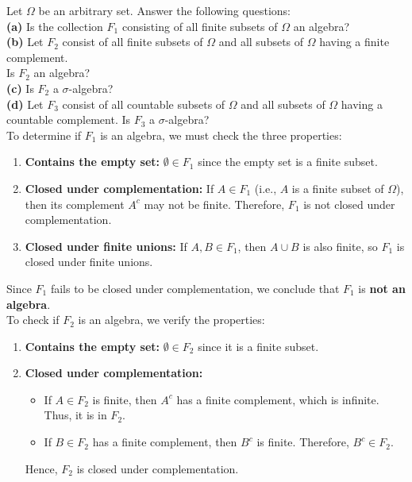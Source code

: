 \begin{example}
    Let \(\Omega\) be an arbitrary set. Answer the following questions:\\
    \textbf{(a)} Is the collection \(F_1\) consisting of all finite subsets of \(\Omega\) an algebra?\\
    \textbf{(b)} Let \(F_2\) consist of all finite subsets of \(\Omega\) and all subsets of \(\Omega\) having a finite complement.\\
    Is \(F_2\) an algebra?\\
    \textbf{(c)} Is \(F_2\) a \(\sigma\)-algebra?\\
    \textbf{(d)} Let \(F_3\) consist of all countable subsets of \(\Omega\) and all subsets of \(\Omega\) having a countable complement. Is \(F_3\) a \(\sigma\)-algebra?\\


To determine if \(F_1\) is an algebra, we must check the three properties:

    \begin{enumerate}
        \item \textbf{Contains the empty set:} \(\emptyset \in F_1\) since the empty set is a finite subset.
        
        \item \textbf{Closed under complementation:} If \(A \in F_1\) (i.e., \(A\) is a finite subset of \(\Omega\)), then its complement \(A^c\) may not be finite. Therefore, \(F_1\) is not closed under complementation.
        
        \item \textbf{Closed under finite unions:} If \(A, B \in F_1\), then \(A \cup B\) is also finite, so \(F_1\) is closed under finite unions.
    \end{enumerate}

    Since \(F_1\) fails to be closed under complementation, we conclude that \(F_1\) is \textbf{not an algebra}.\\

To check if \(F_2\) is an algebra, we verify the properties:

\begin{enumerate}
    \item \textbf{Contains the empty set:} \(\emptyset \in F_2\) since it is a finite subset.
    
    \item \textbf{Closed under complementation:}
    \begin{itemize}
        \item If \(A \in F_2\) is finite, then \(A^c\) has a finite complement, which is infinite. Thus, it is in \(F_2\).
        \item If \(B \in F_2\) has a finite complement, then \(B^c\) is finite. Therefore, \(B^c \in F_2\).
    \end{itemize}
    Hence, \(F_2\) is closed under complementation.


\end{enumerate}
\end{example}
